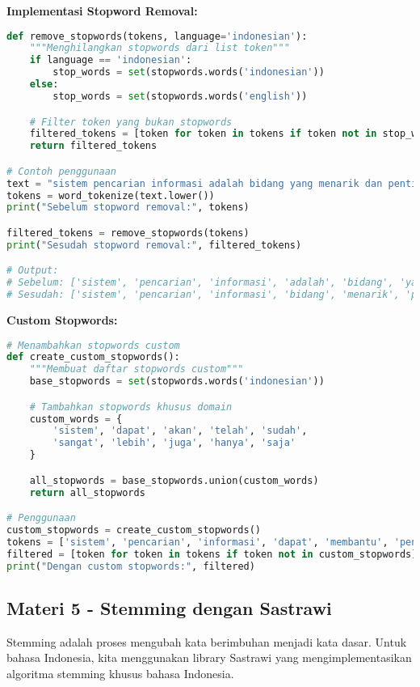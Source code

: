 \textbf{Implementasi Stopword Removal:}
\begin{lstlisting}[language=python, style=python]
def remove_stopwords(tokens, language='indonesian'):
    """Menghilangkan stopwords dari list token"""
    if language == 'indonesian':
        stop_words = set(stopwords.words('indonesian'))
    else:
        stop_words = set(stopwords.words('english'))

    # Filter token yang bukan stopwords
    filtered_tokens = [token for token in tokens if token not in stop_words]
    return filtered_tokens

# Contoh penggunaan
text = "sistem pencarian informasi adalah bidang yang menarik dan penting"
tokens = word_tokenize(text.lower())
print("Sebelum stopword removal:", tokens)

filtered_tokens = remove_stopwords(tokens)
print("Sesudah stopword removal:", filtered_tokens)

# Output:
# Sebelum: ['sistem', 'pencarian', 'informasi', 'adalah', 'bidang', 'yang', 'menarik', 'dan', 'penting']
# Sesudah: ['sistem', 'pencarian', 'informasi', 'bidang', 'menarik', 'penting']
\end{lstlisting}

\textbf{Custom Stopwords:}
\begin{lstlisting}[language=python, style=python]
# Menambahkan stopwords custom
def create_custom_stopwords():
    """Membuat daftar stopwords custom"""
    base_stopwords = set(stopwords.words('indonesian'))

    # Tambahkan stopwords khusus domain
    custom_words = {
        'sistem', 'dapat', 'akan', 'telah', 'sudah',
        'sangat', 'lebih', 'juga', 'hanya', 'saja'
    }

    all_stopwords = base_stopwords.union(custom_words)
    return all_stopwords

# Penggunaan
custom_stopwords = create_custom_stopwords()
tokens = ['sistem', 'pencarian', 'informasi', 'dapat', 'membantu', 'pengguna']
filtered = [token for token in tokens if token not in custom_stopwords]
print("Dengan custom stopwords:", filtered)
\end{lstlisting}

\subsection*{Materi 5 - Stemming dengan Sastrawi}

Stemming adalah proses mengubah kata berimbuhan menjadi kata dasar. Untuk bahasa Indonesia, kita menggunakan library Sastrawi yang mengimplementasikan algoritma stemming khusus bahasa Indonesia.

